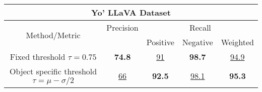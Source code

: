\small
\begin{tabular}{|c|c|c|c|c|}
\hline
\multicolumn{5}{|c|}{\textbf{Yo' LLaVA Dataset}} \\
\hline
\multirow{2}{*}{Method/Metric} & \multicolumn{1}{c|}{Precision} & \multicolumn{3}{c|}{Recall} \\
 & & Positive & Negative & Weighted \\
\hline
Fixed threshold $\tau = 0.75$ & \textbf{74.8} & \underline{91} & \textbf{98.7} & \underline{94.9}\\
\hline
Object specific threshold $\tau = \mu - \sigma/2$  & \underline{66} & \textbf{92.5} & \underline{98.1} & \textbf{95.3}\\
\hline

\end{tabular}